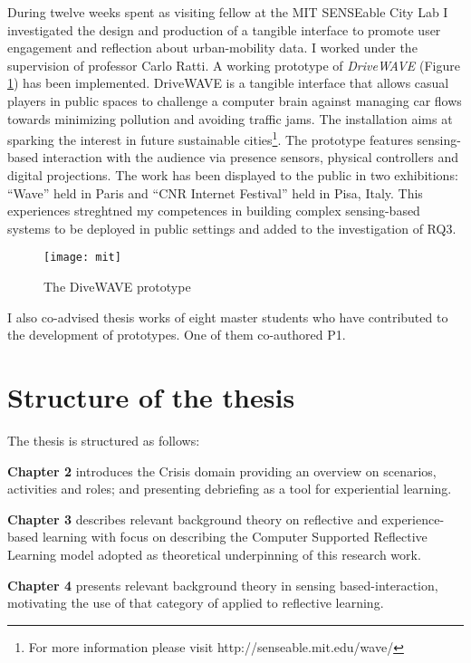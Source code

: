 During twelve weeks spent as visiting fellow at the MIT SENSEable City Lab I investigated the design and production of a tangible interface to promote user engagement and reflection about urban-mobility data. I worked under the supervision of professor Carlo Ratti. A working prototype of \emph{DriveWAVE} (Figure \ref{fig:drivewave}) has been implemented. DriveWAVE is a tangible interface that allows casual players in public spaces to challenge a computer brain against managing car flows towards minimizing pollution and avoiding traffic jams. The installation aims at sparking the interest in future sustainable cities\footnote{For more information please visit http://senseable.mit.edu/wave/}. The prototype features sensing-based interaction with the audience via presence sensors, physical controllers and digital projections. The work has been displayed to the public in two exhibitions: ``Wave'' held in Paris and ``CNR Internet Festival'' held in Pisa, Italy. This experiences streghtned my competences in building complex sensing-based systems to be deployed in public settings and added to the investigation of RQ3.
\begin{figure}
	[h] \centering 
	\texttt{[image: mit]} \caption{The DiveWAVE prototype} \label{fig:drivewave} 
\end{figure}

I also co-advised thesis works of eight master students who have contributed to the development of prototypes. One of them co-authored P1.

\section{Structure of the thesis}\label{structure-of-the-thesis}

The thesis is structured as follows:

\textbf{Chapter 2} introduces the Crisis domain providing an overview on scenarios, activities and roles; and presenting debriefing as a tool for experiential learning.

\textbf{Chapter 3} describes relevant background theory on reflective and experience-based learning with focus on describing the Computer Supported Reflective Learning model adopted as theoretical underpinning of this research work.

\textbf{Chapter 4} presents relevant background theory in sensing based-interaction, motivating the use of that category of applied to reflective learning.

